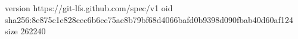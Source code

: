 version https://git-lfs.github.com/spec/v1
oid sha256:8e875c1e828cec6b6ce75ae8b79bf68d4066bafd0b9398d090fbab40d60af124
size 262240
